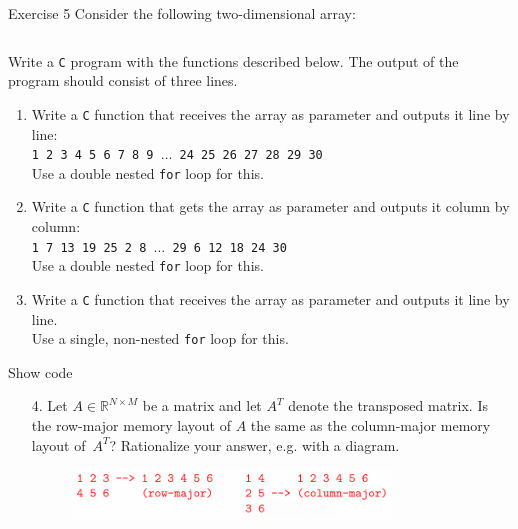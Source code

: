 \documentclass[10pt]{beamer}
\begin{document}
\begin{frame}[allowframebreaks]{Exercise 5}
   Consider the following two-dimensional array:
    \inputminted{c}{code/array.c}
	Write a \texttt{C} program with the functions described below.
	The output of the program should consist of three lines.
	\begin{enumerate}
		\item%
			\label{crowsdbl}%
			Write a \texttt{C} function that receives the array as parameter and outputs it line by line:\\
			\texttt{1 2 3 4 5 6 7 8 9 $\ldots$ 24 25 26 27 28 29 30}\\
			Use a double nested \texttt{for} loop for this.
		\item%
			\label{ccolsdbl}%
			Write a \texttt{C} function that gets the array as parameter and outputs it column by column:\\
			\texttt{1 7 13 19 25 2 8 $\ldots$ 29 6 12 18 24 30 }\\
			Use a double nested \texttt{for} loop for this.
		\item%
			Write a \texttt{C} function that receives the array as parameter and outputs it line by line.\\
			Use a single, non-nested \texttt{for} loop for this.
	\end{enumerate}
    \alert{Show code}
	\begin{enumerate}
		\item[4.]%
			Let $A \in \mathbb{R}^{N \times M}$ be a matrix and let $A^T$ denote the transposed matrix.
			Is the row-major memory layout of $A$ the same as the column-major memory layout of~$A^T$?
			Rationalize your answer, e.g. with a diagram.\\
        \begin{figure}
            \includegraphics[keepaspectratio, width=0.8\textwidth, height=0.73\textheight-2\baselineskip-2\baselineskip]{img/060_row_col_major.png} \\
        \end{figure}
	\end{enumerate}
\end{frame}
\end{document}
